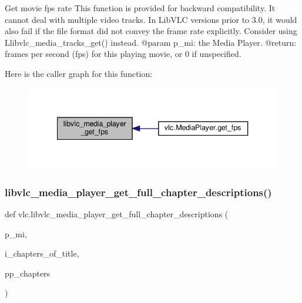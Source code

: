 \begin{DoxyVerb}Get movie fps rate
This function is provided for backward compatibility. It cannot deal with
multiple video tracks. In LibVLC versions prior to 3.0, it would also fail
if the file format did not convey the frame rate explicitly.
\deprecated Consider using L{libvlc_media_tracks_get}() instead.
@param p_mi: the Media Player.
@return: frames per second (fps) for this playing movie, or 0 if unspecified.
\end{DoxyVerb}
 Here is the caller graph for this function\+:
\nopagebreak
\begin{figure}[H]
\begin{center}
\leavevmode
\includegraphics[width=340pt]{namespacevlc_a29146dbf43a47a18afeb6834dcc3c51b_icgraph}
\end{center}
\end{figure}
\mbox{\label{namespacevlc_adf5d3e952881c8a2d36db4a98bfda4a2}} 
\subsubsection{\texorpdfstring{libvlc\+\_\+media\+\_\+player\+\_\+get\+\_\+full\+\_\+chapter\+\_\+descriptions()}{libvlc\_media\_player\_get\_full\_chapter\_descriptions()}}
{\footnotesize\ttfamily def vlc.\+libvlc\+\_\+media\+\_\+player\+\_\+get\+\_\+full\+\_\+chapter\+\_\+descriptions (\begin{DoxyParamCaption}\item[{}]{p\+\_\+mi,  }\item[{}]{i\+\_\+chapters\+\_\+of\+\_\+title,  }\item[{}]{pp\+\_\+chapters }\end{DoxyParamCaption})}

